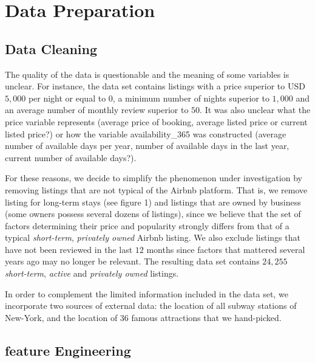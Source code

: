 \documentclass{article}
\begin{document}
	
\section{Data Preparation}
\subsection{Data Cleaning}

The quality of the data is questionable and the meaning of some variables is unclear. For instance, the data set contains listings with a price superior to USD$5,000$ per night or equal to $0$, a minimum number of nights superior to $1,000$ and an average number of monthly review superior to $50$. It was also unclear what the price variable represents (average price of booking, average listed price or current listed price?) or how the variable availability\_365 was constructed (average number of available days per year, number of available days in the last year, current number of available days?).


For these reasons, we decide to simplify the phenomenon under investigation by removing listings that are not typical of the Airbnb platform. That is, we remove listing for long-term stays (see figure 1) and listings that are owned by business (some owners possess several dozens of listings), since we believe that the set of factors determining their price and popularity strongly differs from that of a typical \textit{short-term}, \textit{privately owned} Airbnb listing. We also exclude listings that have not been reviewed in the last $12$ months since factors that mattered several years ago may no longer be relevant. The resulting data set contains $24,255$ \textit{short-term}, \textit{active} and \textit{privately owned} listings.

In order to complement the limited information included in the data set, we incorporate two sources of external data: the location of all subway stations of New-York, and the location of $36$ famous attractions that we hand-picked.

\subsection{feature Engineering}
\end{document}
